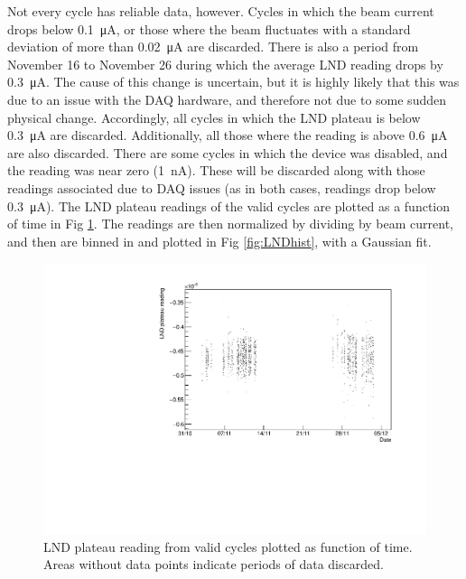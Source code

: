 \documentclass[10pt,letterpaper]{article}
\begin{document}
Not every cycle has reliable data, however. Cycles in which the beam current drops below \SI{0.1}{\micro\ampere}, or those where the beam fluctuates with a standard deviation of more than \SI{0.02}{\micro\ampere} are discarded. There is also a period from November 16 to November 26 during which the average LND reading drops by \approx\SI{0.3}{\micro\ampere}. The cause of this change is uncertain, but it is highly likely that this was due to an issue with the DAQ hardware, and therefore not due to some sudden physical change. Accordingly, all cycles in which the LND plateau is below \SI{0.3}{\micro\ampere} are discarded. Additionally, all those where the reading is above \SI{0.6}{\micro\ampere} are also discarded. There are some cycles in which the device was disabled, and the reading was near zero (\approx \SI{1}{\nano\ampere}). These will be discarded along with those readings associated due to DAQ issues (as in both cases, readings drop below \SI{0.3}{\micro\ampere}). The LND plateau readings of the valid cycles are plotted as a function of time in Fig \ref{fig:LNDreadings}. The readings are then normalized by dividing by beam current, and then are binned in and plotted in Fig \ref{fig:LNDhist}, with a Gaussian fit.

\begin{figure}
\centering
\includegraphics[width=\textwidth,page=1]{../thermal_neutron_detector/lndReadingOverTime.pdf}
\caption{LND plateau reading from valid cycles plotted as function of time. Areas without data points indicate periods of data discarded.}
\label{fig:LNDreadings}
\end{figure}
\end{document}
